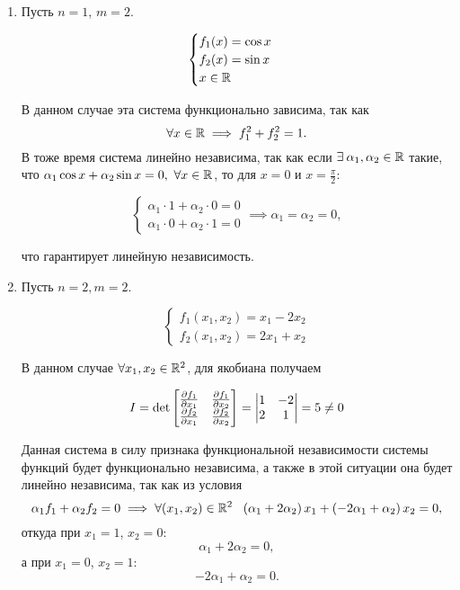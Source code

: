 \documentclass[../../main.tex]{subfiles}
\begin{document}
\begin{exmps}

~

	\begin{enumerate}
		\item
		Пусть $n = 1$, $m = 2$.
		
		\[ \begin{cases}
		f_1(x) = \cos x \\
		f_2(x) = \sin x \\
		x \in \mathbb{R}
		\end{cases}  \]
		
		В данном случае эта система функционально зависима, так как 
		\[\forall x \in \mathbb{R} \implies f_1^2 + f_2^2 = 1.\]
		В тоже время система линейно независима, так как если 
		$\exists\:\alpha_1, \alpha_2 \in \mathbb{R} $ такие, что
		$\alpha_1 \cos x + \alpha_2 \sin x = 0,\ \forall x \in 
		\R$, то для $x = 0 \text{ и } x = \frac\pi2$:
		
		\[\begin{cases}
		\alpha_1 \cdot 1 + \alpha_2 \cdot 0 = 0 \\
		\alpha_1 \cdot 0 + \alpha_2 \cdot 1 = 0 
		\end{cases} \implies \alpha_1 = \alpha_2 = 0, \] 
		
		что гарантирует линейную независимость.
		
		\item
		
		Пусть $n = 2, m = 2$.
		
		\[ \begin{cases}
		f_1 \left( x_1, x_2 \right) = x_1 - 2x_2 \\
		f_2 \left( x_1, x_2 \right) = 2x_1 + x_2
		\end{cases} \]
		
		В данном случае $\forall x_1, x_2 \in \mathbb{R}^2$, для якобиана получаем
		
		\[ I = \det \begin{bmatrix}
		\frac{\partial f_1}{\partial x_1} & \frac{\partial f_1}{\partial x_2} \\
		
		\frac{\partial f_2}{\partial x_1} & \frac{\partial f_2}{\partial x_2}
		\end{bmatrix} =
		\begin{vmatrix}
        1 & -2 \\
        2 & 1
		\end{vmatrix} = 5 \ne 0 \]
		
		Данная система в силу признака функциональной 
		независимости системы функций
		будет функционально независима,
		а также в этой ситуации она будет линейно независима, 
		так как из условия \[\alpha_1 f_1 + \alpha_2 f_2 = 0 \implies
		\forall (x_1, x_2) \in \mathbb{R}^2 \ \ \left(\alpha_1 + 
		2\alpha_2\right) x_1 + \left( -2\alpha_1 + \alpha_2 
		\right) x_2 = 0,\]
		откуда при $x_1 = 1$, $x_2 = 0$: \[\alpha_1 + 2\alpha_2 = 0,\]
		а при $x_1 = 0$, $x_2 = 1$: \[-2\alpha_1 + \alpha_2 = 0.\]
		

\end{enumerate}
\end{exmps}
\end{document}
